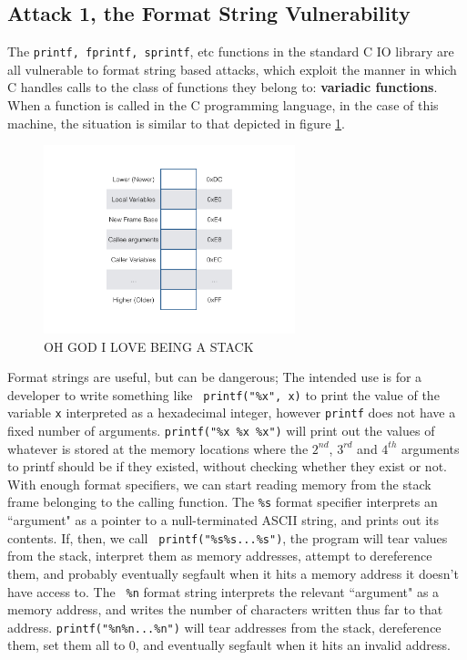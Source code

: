 \subsection{Attack 1, the Format String Vulnerability}

The {\tt printf, fprintf, sprintf}, etc functions in the standard C IO library are all vulnerable to format string based
attacks, which exploit the manner in which C handles calls to the class of functions they belong to: \textbf{variadic
functions}\cite{vfunc}. When a function is called in the C programming language,
in the case of this machine, the situation is similar to that depicted in figure \ref{fig_stack}. 

\begin{figure}[ht]     \centering     \includegraphics[width = 0.65\textwidth]{./images/stack.jpg}     \caption{OH
GOD I LOVE BEING A STACK}     \label{fig_stack} \end{figure}

Format strings are useful, but can be dangerous; The intended use is for a developer to write something like {\tt
printf("\%x", x)} to print the value of the variable {\tt x} interpreted as a hexadecimal integer, however {\tt printf}
does not have a fixed number of arguments. {\tt printf("\%x \%x \%x")} will print out
the values of whatever is stored at the memory locations where the $2^{nd}$, $3^{rd}$ and $4^{th}$ arguments to printf
should be if they existed, without checking whether they exist or not. With enough format specifiers, we can start
reading memory from the stack frame belonging to the calling function. The {\tt \%s} format specifier interprets an
``argument" as a pointer to a null-terminated ASCII string, and prints out its contents. If, then, we call {\tt
printf("\%s\%s...\%s")}, the program will tear values from the stack, interpret them as memory addresses, attempt to
dereference them, and probably eventually segfault when it hits a memory address it doesn't have access to. The {\tt
\%n} format string interprets the relevant ``argument" as a memory address, and writes the number of characters written
thus far to that address. {\tt printf("\%n\%n...\%n")} will tear addresses from the stack, dereference them, set them
all to 0, and eventually segfault when it hits an invalid address.


